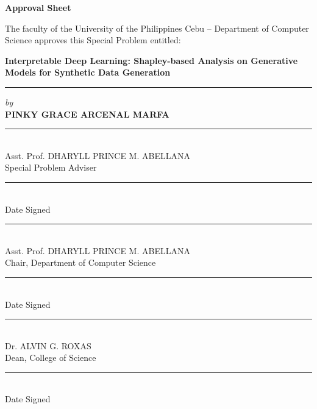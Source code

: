 \documentclass{article}
\begin{document}
\begin{titlepage}
\begin{center}
    \Large\textbf{Approval Sheet}
\end{center}
\vspace{1em}

The faculty of the University of the Philippines Cebu -- Department of Computer Science approves this Special Problem entitled:

\begin{center}
    \vspace{3em}
    \textbf{Interpretable Deep Learning: Shapley-based Analysis on Generative Models for Synthetic Data Generation}\\
    \vspace{3em}
    \rule{\textwidth}{0.7pt} %
    \textit{by}\\
    \textbf{PINKY GRACE ARCENAL MARFA}
\end{center}

\vfill

\noindent
\begin{minipage}[t]{0.65\textwidth}
    \centering
    \rule{8.5cm}{0.4pt}\\
    Asst. Prof. DHARYLL PRINCE M. ABELLANA \\
    Special Problem Adviser
\end{minipage}
\hfill
\begin{minipage}[t]{0.3\textwidth}
    \centering
    \rule{3cm}{0.4pt} \\
    Date Signed
\end{minipage}

\vfill

\noindent
\begin{minipage}[t]{0.65\textwidth}
    \centering
    \rule{8.5cm}{0.4pt} \\
    Asst. Prof. DHARYLL PRINCE M. ABELLANA \\
    Chair, Department of Computer Science
\end{minipage}
\hfill
\begin{minipage}[t]{0.3\textwidth}
    \centering
    \rule{3cm}{0.4pt} \\
    Date Signed
\end{minipage}

\vfill

\noindent
\begin{minipage}[t]{0.65\textwidth}
    \centering
    \rule{8.5cm}{0.4pt} \\
    Dr. ALVIN G. ROXAS \\
    Dean, College of Science
\end{minipage}
\hfill
\begin{minipage}[t]{0.3\textwidth}
    \centering
    \rule{3cm}{0.4pt} \\
    Date Signed
\end{minipage}
\end{titlepage}
\end{document}
